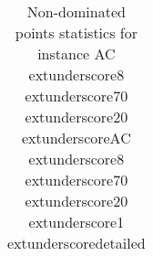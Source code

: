 \begin{table}
\caption{Non-dominated points statistics for instance AC	extunderscore8	extunderscore70	extunderscore20	extunderscoreAC	extunderscore8	extunderscore70	extunderscore20	extunderscore1	extunderscoredetailed}
\label{tab:stats/AC_8_70_20_AC_8_70_20_1_detailed}
\begin{tabular}{}
\toprule
\midrule
\bottomrule
\end{tabular}
\end{table}

